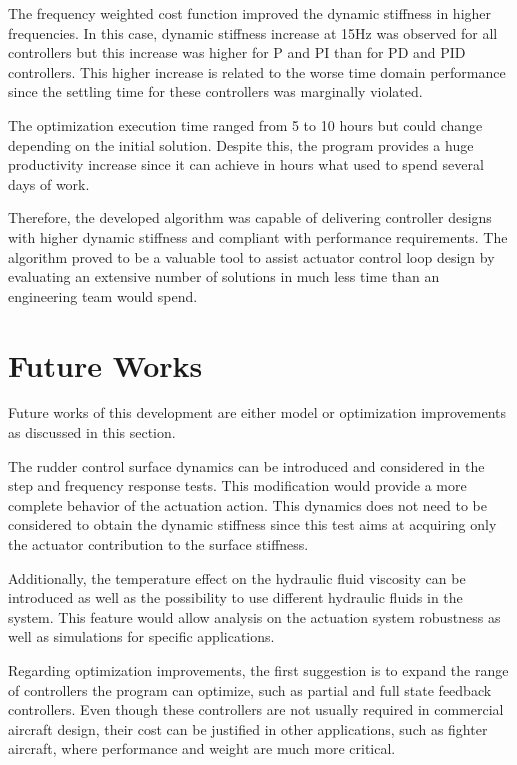 The frequency weighted cost function improved the dynamic stiffness in higher frequencies. In this case, dynamic stiffness increase at 15Hz was observed for all controllers but this increase was higher for P and PI than for PD and PID controllers.  This higher increase is related to the worse time domain performance since the settling time for these controllers was marginally violated.

The optimization execution time ranged from 5 to 10 hours but could change depending on the initial solution. Despite this, the program provides a huge productivity increase since it can achieve in hours what used to spend several days of work.

Therefore, the developed algorithm was capable of delivering controller designs with higher dynamic stiffness and compliant with performance requirements. The algorithm proved to be a valuable tool to assist actuator control loop design by evaluating an extensive number of solutions in much less time than an engineering team would spend.

\section{Future Works}

Future works of this development are either model or optimization improvements as discussed in this section.

The rudder control surface dynamics can be introduced and considered in the step and frequency response tests. This modification would provide a more complete behavior of the actuation action. This dynamics does not need to be considered to obtain the dynamic stiffness since this test aims at acquiring only the actuator contribution to the surface stiffness.

Additionally, the temperature effect on the hydraulic fluid viscosity can be introduced as well as the possibility to use different hydraulic fluids in the system. This feature would allow analysis on the actuation system robustness as well as simulations for specific applications.

Regarding optimization improvements, the first suggestion is to expand the range of controllers the program can optimize, such as partial and full state feedback controllers. Even though these controllers are not usually required in commercial aircraft design, their cost can be justified in other applications, such as fighter aircraft, where performance and weight are much more critical.

